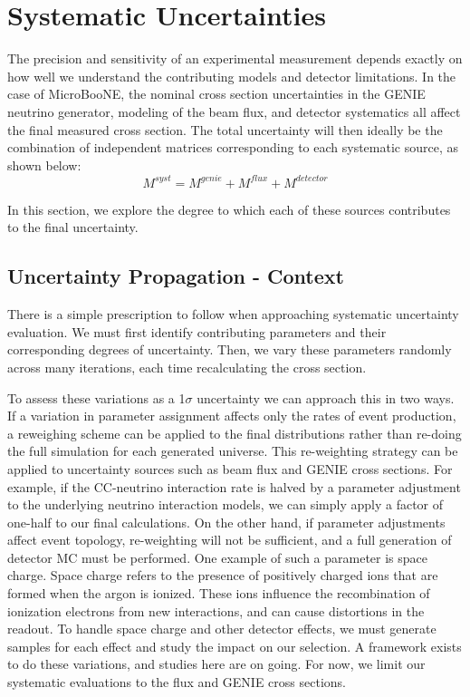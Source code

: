 \documentclass{article}
\begin{document}
\clearpage
\section{Systematic Uncertainties}
The precision and sensitivity of an experimental measurement depends exactly on how well we understand the contributing models and detector limitations. In the case of MicroBooNE, the nominal cross section uncertainties in the GENIE neutrino generator, modeling of the beam flux, and detector systematics all affect the final measured cross section. The total uncertainty will then ideally be the combination of independent matrices corresponding to each systematic source, as shown below:
\begin{equation}
\label{eq:sys_error}
M^{syst} =  M^{genie} + M^{flux} + M^{detector}
\end{equation}

\noindent In this section, we explore the degree to which each of these sources contributes to the final uncertainty. 
\subsection{Uncertainty Propagation - Context} 
There is a simple prescription to follow when approaching systematic uncertainty evaluation. We must first identify contributing parameters and their corresponding degrees of uncertainty.  Then, we vary these parameters randomly across many iterations, each time recalculating the cross section.
\par To assess these variations as a 1$\sigma$ uncertainty we can approach this in two ways. If a variation in parameter assignment affects only the rates of event production, a reweighing scheme can be applied to the final distributions rather than re-doing the full simulation for each generated universe.  This re-weighting strategy can be applied to uncertainty sources such as beam flux and GENIE cross sections.  For example, if the CC-neutrino interaction rate is halved by a parameter adjustment to the underlying neutrino interaction models, we can simply apply a factor of one-half to our final calculations.  On the other hand, if parameter adjustments affect event topology, re-weighting will not be sufficient, and a full generation of detector MC must be performed. One example of such a parameter is space charge. Space charge refers to the presence of positively charged ions that are formed when the argon is ionized.  These ions influence the recombination of ionization electrons from new interactions, and can cause distortions in the readout. To handle space charge and other detector effects, we must generate samples for each effect and study the impact on our selection. A framework exists to do these variations, and studies here are on going. For now, we limit our systematic evaluations to the flux and GENIE cross sections.
\end{document}
